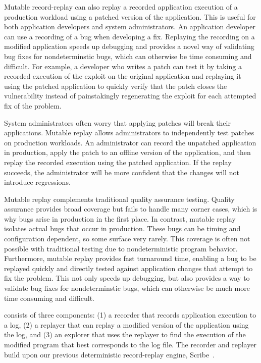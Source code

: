 Mutable record-replay can also replay a recorded
application execution of a production workload using
a patched version of the application. This is
useful for both application developers and system administrators.
An application developer can use a recording of a bug when developing
a fix. Replaying the recording on a modified application speeds up
debugging and provides a novel way of validating
bug fixes for nondeterminstic bugs, which can otherwise be time
consuming and difficult.
For example, a developer who writes a patch
can test it by taking a recorded execution of the exploit on the
original application and replaying it using the patched application to
quickly verify that the patch closes the vulnerability instead of
painstakingly regenerating the exploit for each attempted fix
of the problem.

System administrators often worry that applying patches
will break their applications.  Mutable replay allows administrators
to independently test patches on production workloads.  An
administrator can record the unpatched application in production,
apply the patch to an offline version of the application, and then replay
the recorded execution using the patched application.  If the
replay succeeds, the administrator will be more confident that
the changes will not introduce regressions.

Mutable replay complements traditional quality assurance
testing.  Quality assurance provides broad coverage but fails to
handle many corner cases, which is why bugs arise in production in the
first place.  In contrast, mutable replay isolates
actual bugs that occur in production. These bugs can be timing and
configuration dependent, so some surface very rarely. This coverage is often
not possible with traditional testing
due to nondeterministic program behavior.  Furthermore, mutable replay
provides fast turnaround time, enabling a bug to be replayed quickly
and directly tested against application changes that attempt to fix
the problem.
This not only speeds up debugging, but also provides a
way to validate bug fixes for nondeterminstic bugs, which can
otherwise be much more time consuming and difficult.

{\dora} consists of three components: (1) a recorder that records
application execution to a log, (2) a replayer that can replay a
modified version of the application using the log, and (3) an explorer
that uses the replayer to find the execution of the modified program
that best corresponds to the log file. The recorder and replayer build
upon our previous deterministic record-replay engine,
Scribe~\cite{scribe:sigmetrics10}.

